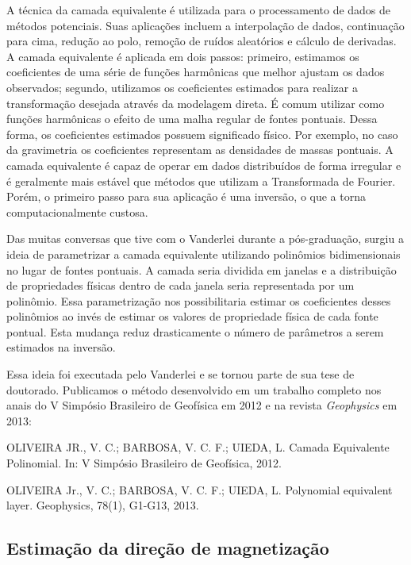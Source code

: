 A técnica da camada equivalente é utilizada para o processamento de dados de
métodos potenciais.
Suas aplicações incluem a interpolação de dados, continuação para cima, redução
ao polo, remoção de ruídos aleatórios e cálculo de derivadas.
A camada equivalente é aplicada em dois passos:
primeiro, estimamos os coeficientes de uma série de funções harmônicas que
melhor ajustam os dados observados;
segundo, utilizamos os coeficientes estimados para realizar a transformação
desejada através da modelagem direta.
É comum utilizar como funções harmônicas o efeito de uma malha regular de
fontes pontuais.
Dessa forma, os coeficientes estimados possuem significado físico.
Por exemplo, no caso da gravimetria os coeficientes representam as densidades
de massas pontuais.
A camada equivalente é capaz de operar em dados distribuídos de forma irregular
e é geralmente mais estável que métodos que utilizam a Transformada de Fourier.
Porém, o primeiro passo para sua aplicação é uma inversão, o que a torna
computacionalmente custosa.

Das muitas conversas que tive com o Vanderlei durante a pós-graduação,
surgiu a ideia de parametrizar a camada equivalente utilizando polinômios
bidimensionais no lugar de fontes pontuais.
A camada seria dividida em janelas e a distribuição de propriedades físicas
dentro de cada janela seria representada por um polinômio.
Essa parametrização nos possibilitaria estimar os coeficientes desses
polinômios ao invés de estimar os valores de propriedade física de cada fonte
pontual.
Esta mudança reduz drasticamente o número de parâmetros a serem estimados na
inversão.

Essa ideia foi executada pelo Vanderlei e se tornou parte de sua tese de
doutorado.
Publicamos o método desenvolvido
em um trabalho completo nos anais do V Simpósio Brasileiro de Geofísica em 2012
e na revista \textit{Geophysics} em 2013:

\begin{displayquote}
    OLIVEIRA JR., V. C.; BARBOSA, V. C. F.; UIEDA, L.
    Camada Equivalente Polinomial. In: V Simpósio Brasileiro de Geofísica,
    2012.
\end{displayquote}

\begin{displayquote}
    OLIVEIRA Jr., V. C.; BARBOSA,  V. C. F.; UIEDA, L. Polynomial equivalent
    layer. Geophysics, 78(1), G1-G13, 2013.
\end{displayquote}



\subsection{Estimação da direção de magnetização}


